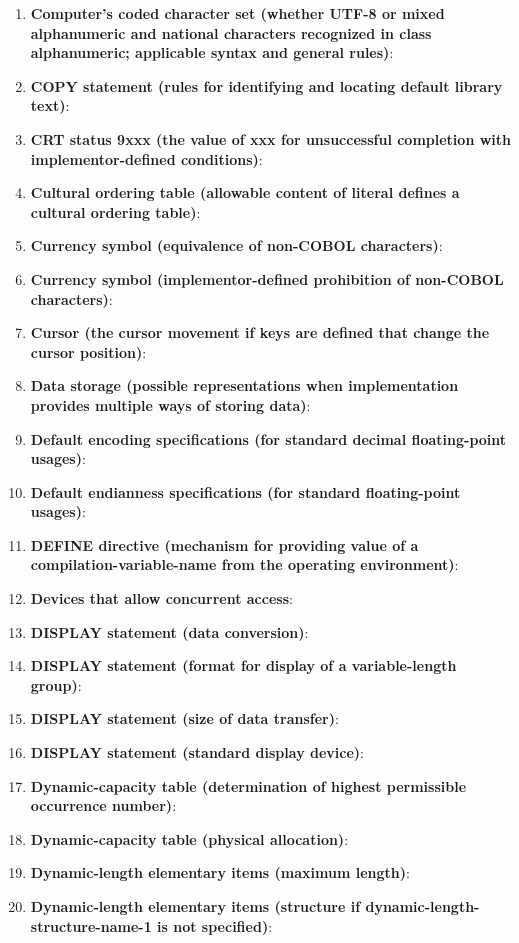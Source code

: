 \begin{enumerate}
\item \textbf{Computer's coded character set (whether UTF-8 or mixed alphanumeric and national characters recognized in class alphanumeric; applicable syntax and general rules)}:
\item \textbf{COPY statement (rules for identifying and locating default library text)}:
\item \textbf{CRT status 9xxx (the value of xxx for unsuccessful completion with implementor-defined conditions)}:
\item \textbf{Cultural ordering table (allowable content of literal defines a cultural ordering table)}:
\item \textbf{Currency symbol (equivalence of non-COBOL characters)}:
\item \textbf{Currency symbol (implementor-defined prohibition of non-COBOL characters)}:
\item \textbf{Cursor (the cursor movement if keys are defined that change the cursor position)}:
\item \textbf{Data storage (possible representations when implementation provides multiple ways of storing data)}:
\item \textbf{Default encoding specifications (for standard decimal floating-point usages)}:
\item \textbf{Default endianness specifications (for standard floating-point usages)}:
\item \textbf{DEFINE directive (mechanism for providing value of a compilation-variable-name from the operating environment)}:
\item \textbf{Devices that allow concurrent access}:
\item \textbf{DISPLAY statement (data conversion)}:
\item \textbf{DISPLAY statement (format for display of a variable-length group)}:
\item \textbf{DISPLAY statement (size of data transfer)}:
\item \textbf{DISPLAY statement (standard display device)}:
\item \textbf{Dynamic-capacity table (determination of highest permissible occurrence number)}:
\item \textbf{Dynamic-capacity table (physical allocation)}:
\item \textbf{Dynamic-length elementary items (maximum length)}:
\item \textbf{Dynamic-length elementary items (structure if dynamic-length-structure-name-1 is not specified)}:

\end{enumerate}
